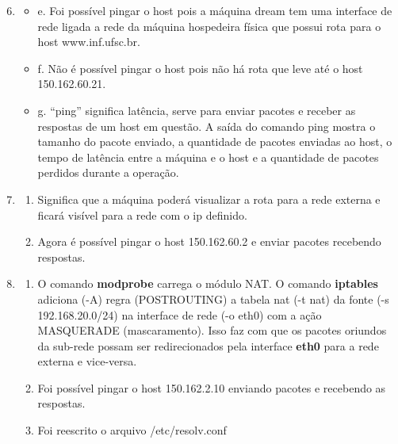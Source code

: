 \documentclass[a4paper, 12pt]{article}
\begin{document}
\begin{enumerate}
  \setcounter{enumi}{5}

\item 
\begin{itemize}

  \item{e.} Foi possível pingar o host pois a máquina dream tem uma interface
    de rede ligada a rede da máquina hospedeira física que possui rota para o
    host www.inf.ufsc.br.
  \item{f.} Não é possível pingar o host pois não há rota que leve até
    o host 150.162.60.21.
  \item{g.} ``ping'' significa latência, serve para enviar pacotes e
    receber as respostas de um host em questão. A saída do comando
    ping mostra o tamanho do pacote enviado, a quantidade de pacotes
    enviadas ao host, o tempo de latência entre a máquina e o host e a
    quantidade de pacotes perdidos durante a operação.

\end{itemize}

\item
\begin{enumerate}

\item Significa que a máquina poderá visualizar a rota para a rede
  externa e ficará visível para a rede com o ip definido.

\item Agora é possível pingar o host 150.162.60.2 e enviar pacotes
  recebendo respostas.

\end{enumerate}

\item
\begin{enumerate}

\item O comando {\bf modprobe} carrega o módulo NAT. O comando {\bf
    iptables} adiciona (-A) regra (POSTROUTING) a tabela nat (-t nat)
  da fonte (-s 192.168.20.0/24) na interface de rede (-o eth0) com a
  ação MASQUERADE (mascaramento). Isso faz com que os pacotes oriundos
  da sub-rede possam ser redirecionados pela interface {\bf eth0} para
  a rede externa e vice-versa.

\item Foi possível pingar o host 150.162.2.10 enviando pacotes e
  recebendo as respostas.

\item Foi reescrito o arquivo /etc/resolv.conf


\end{enumerate}
\end{enumerate}
\end{document}
